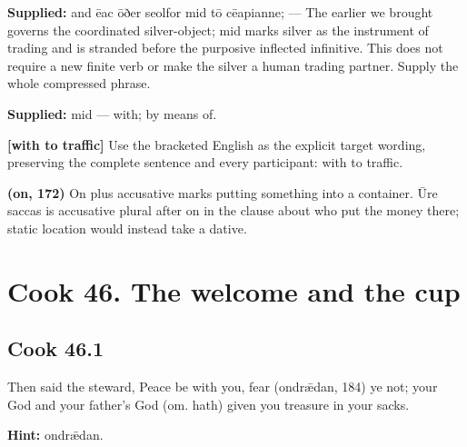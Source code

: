 \textbf{Supplied:} and ēac ōðer seolfor mid tō cēapianne; — The earlier we brought governs the coordinated silver-object; mid marks silver as the instrument of trading and is stranded before the purposive inflected infinitive. This does not require a new finite verb or make the silver a human trading partner. Supply the whole compressed phrase.

\textbf{Supplied:} mid — with; by means of.

\textbf{[with to traffic]} Use the bracketed English as the explicit target wording, preserving the complete sentence and every participant: with to traffic.

\textbf{(on, 172)} On plus accusative marks putting something into a container. Ūre saccas is accusative plural after on in the clause about who put the money there; static location would instead take a dative.

\section*{Cook 46. The welcome and the cup}

\par\begin{minipage}{\linewidth}\raggedright
\subsection*{Cook 46.1}

Then said the steward, Peace be with you, fear (ondrǣdan, 184) ye not; your God and your father’s God (om. hath) given you treasure in your sacks.

\textbf{Hint:} ondrǣdan.

\end{minipage}\par\addvspace{4pt}


